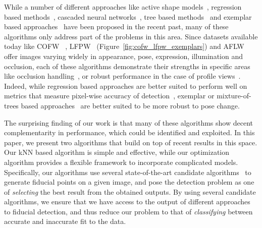 While a number of different approaches like active shape models~\cite{milborrowCVPR08_ASM},
regression based methods~\cite{yuECCV14_CoR}, cascaded neural
networks~\cite{zhangECCV14_deepfacealign}, tree based methods~\cite{xhuCVPR12_wild} 
and exemplar based approaches~\cite{kumarPAMI13_faceExem}
have been proposed in the recent past, many of these algorithms only
address part of the problems in this area. Since datasets available today like
COFW~\cite{artizzzuICCV13_COFW} ,
LFPW~\cite{kumarPAMI13_faceExem} (Figure~\ref{fig:cofw_lfpw_exemplars}) and AFLW~\cite{koetsingerBFIAT11_AFLW} %
offer images varying widely in appearance, pose, expression, illumination and occlusion,
each of these algorithms demonstrate their strengths in specific areas like
occlusion handling~\cite{artizzzuICCV13_COFW}, or robust performance in the
case of profile views~\cite{xhuCVPR12_wild}. Indeed, while regression based approaches are 
better suited to perform well on metrics that measure pixel-wise accuracy
of detection~\cite{milborrowCVPR08_ASM, yuECCV14_CoR}, exemplar or mixture-of-trees based
approaches~\cite{kumarPAMI13_faceExem, xhuCVPR12_wild} are better suited to be
more robust to pose change.


The surprising finding of our work is that many of these algorithms show
decent complementarity in performance, which could be identified and exploited.
In this paper, we present two algorithms that build on top of recent results in this space. 
Our kNN based algorithm is simple and effective, while our optimization algorithm provides a 
flexible framework to incorporate complicated models.  Specifically, our 
algorithms use several state-of-the-art candidate algorithms~\cite{xhuCVPR12_wild, xiongCVPR13_SDM,
artizzzuICCV13_COFW, asthanaCVPR14_Chehra, Tzimiropoulos_2015_CVPR} to generate
fiducial points on a given image, and pose the detection problem as one
of \emph{selecting} the best result from the obtained outputs. By using several
candidate algorithms, we ensure that we have access to the output of different approaches
to fiducial detection, and thus reduce our problem to that of \emph{classifying} 
between accurate and inaccurate fit to the data.

